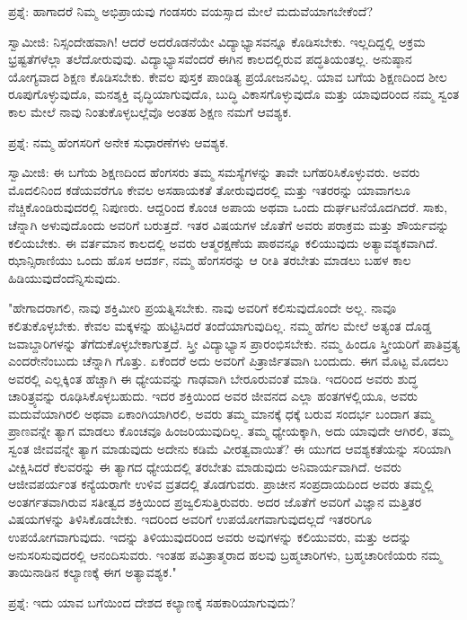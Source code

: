 ಪ್ರಶ್ನೆ: ಹಾಗಾದರೆ ನಿಮ್ಮ ಅಭಿಪ್ರಾಯವು ಗಂಡಸರು ವಯಸ್ಸಾದ ಮೇಲೆ ಮದುವೆಯಾಗಬೇಕೆಂದೆ?

ಸ್ವಾಮೀಜಿ: ನಿಸ್ಸಂದೇಹವಾಗಿ! ಆದರೆ ಅದರೊಡನೆಯೇ ವಿದ್ಯಾಭ್ಯಾಸವನ್ನೂ ಕೊಡಿಸಬೇಕು. ಇಲ್ಲದಿದ್ದಲ್ಲಿ ಅಕ್ರಮ ಭ್ರಷ್ಟತೆಗಳೆಲ್ಲಾ ತಲೆದೋರುವುವು. ವಿದ್ಯಾಭ್ಯಾಸವೆಂದರೆ ಈಗಿನ ಕಾಲದಲ್ಲಿರುವ ಪದ್ಧತಿಯಂತಲ್ಲ. ಅನುಷ್ಠಾನ ಯೋಗ್ಯವಾದ ಶಿಕ್ಷಣ ಕೊಡಿಸಬೇಕು. ಕೇವಲ ಪುಸ್ತಕ ಪಾಂಡಿತ್ಯ ಪ್ರಯೋಜನವಿಲ್ಲ. ಯಾವ ಬಗೆಯ ಶಿಕ್ಷಣದಿಂದ ಶೀಲ ರೂಪುಗೊಳ್ಳುವುದೊ, ಮನಶ್ಶಕ್ತಿ ವೃದ್ಧಿಯಾಗುವುದೊ, ಬುದ್ಧಿ ವಿಕಾಸಗೊಳ್ಳುವುದೊ ಮತ್ತು ಯಾವುದರಿಂದ ನಮ್ಮ ಸ್ವಂತ ಕಾಲ ಮೇಲೆ ನಾವು ನಿಂತುಕೊಳ್ಳಬಲ್ಲೆವೊ ಅಂತಹ ಶಿಕ್ಷಣ ನಮಗೆ ಆವಶ್ಯಕ.

ಪ್ರಶ್ನೆ: ನಮ್ಮ ಹೆಂಗಸರಿಗೆ ಅನೇಕ ಸುಧಾರಣೆಗಳು ಆವಶ್ಯಕ.

ಸ್ವಾಮೀಜಿ: ಈ ಬಗೆಯ ಶಿಕ್ಷಣದಿಂದ ಹೆಂಗಸರು ತಮ್ಮ ಸಮಸ್ಯೆಗಳನ್ನು ತಾವೇ ಬಗೆಹರಿಸಿಕೊಳ್ಳುವರು. ಅವರು ಮೊದಲಿನಿಂದ ಕಡೆಯವರೆಗೂ ಕೇವಲ ಅಸಹಾಯಕತೆ ತೋರುವುದರಲ್ಲಿ ಮತ್ತು ಇತರರನ್ನು ಯಾವಾಗಲೂ ನೆಚ್ಚಿಕೊಂಡಿರುವುದರಲ್ಲಿ ನಿಪುಣರು. ಆದ್ದರಿಂದ ಕೊಂಚ ಅಪಾಯ ಅಥವಾ ಒಂದು ದುರ್ಘಟನೆಯೊದಗಿದರೆ. ಸಾಕು, ಚೆನ್ನಾಗಿ ಅಳುವುದೊಂದು ಅವರಿಗೆ ಬರುತ್ತದೆ. ಇತರ ವಿಷಯಗಳ ಜೊತೆಗೆ ಅವರು ಪರಾಕ್ರಮ ಮತ್ತು ಶೌರ್ಯವನ್ನು ಕಲಿಯಬೇಕು. ಈ ವರ್ತಮಾನ ಕಾಲದಲ್ಲಿ ಅವರು ಆತ್ಮರಕ್ಷಣೆಯ ಪಾಠವನ್ನೂ ಕಲಿಯುವುದು ಅತ್ಯಾವಶ್ಯಕವಾಗಿದೆ. ಝಾನ್ಸಿರಾಣಿಯು ಒಂದು ಹೊಸ ಆದರ್ಶ, ನಮ್ಮ ಹೆಂಗಸರನ್ನು ಆ ರೀತಿ ತರಬೇತು ಮಾಡಲು ಬಹಳ ಕಾಲ ಹಿಡಿಯುವುದೆಂದೆನ್ನಿಸುವುದು.

"ಹೇಗಾದರಾಗಲಿ, ನಾವು ಶಕ್ತಿಮೀರಿ ಪ್ರಯತ್ನಿಸಬೇಕು. ನಾವು ಅವರಿಗೆ ಕಲಿಸುವುದೊಂದೇ ಅಲ್ಲ. ನಾವೂ ಕಲಿತುಕೊಳ್ಳಬೇಕು. ಕೇವಲ ಮಕ್ಕಳನ್ನು ಹುಟ್ಟಿಸಿದರೆ ತಂದೆಯಾಗುವುದಿಲ್ಲ. ನಮ್ಮ ಹೆಗಲ ಮೇಲೆ ಅತ್ಯಂತ ದೊಡ್ಡ ಜವಾಬ್ದಾರಿಗಳನ್ನು ತೆಗೆದುಕೊಳ್ಳಬೇಕಾಗುತ್ತದೆ. ಸ್ತ್ರೀ ವಿದ್ಯಾಭ್ಯಾಸ ಪ್ರಾರಂಭಿಸಬೇಕು. ನಮ್ಮ ಹಿಂದೂ ಸ್ತ್ರೀಯರಿಗೆ ಪಾತಿವ್ರತ್ಯ ಎಂದರೇನೆಂಬುದು ಚೆನ್ನಾಗಿ ಗೊತ್ತು. ಏಕೆಂದರೆ ಅದು ಅವರಿಗೆ ಪಿತ್ರಾರ್ಜಿತವಾಗಿ ಬಂದುದು. ಈಗ ಮೊಟ್ಟ ಮೊದಲು ಅವರಲ್ಲಿ ಎಲ್ಲಕ್ಕಿಂತ ಹೆಚ್ಚಾಗಿ ಈ ಧ್ಯೇಯವನ್ನು ಗಾಢವಾಗಿ ಬೇರೂರುವಂತೆ ಮಾಡಿ. ಇದರಿಂದ ಅವರು ಶುದ್ಧ ಚಾರಿತ್ರ್ಯವನ್ನು ರೂಢಿಸಿಕೊಳ್ಳಬಹುದು. ಇದರ ಶಕ್ತಿಯಿಂದ ಅವರ ಜೀವನದ ಎಲ್ಲಾ ಹಂತಗಳಲ್ಲಿಯೂ, ಅವರು ಮದುವೆಯಾಗಿರಲಿ ಅಥವಾ ಏಕಾಂಗಿಯಾಗಿರಲಿ, ಅವರು ತಮ್ಮ ಮಾನಕ್ಕೆ ಧಕ್ಕೆ ಬರುವ ಸಂದರ್ಭ ಬಂದಾಗ ತಮ್ಮ ಪ್ರಾಣವನ್ನೇ ತ್ಯಾಗ ಮಾಡಲು ಕೊಂಚವೂ ಹಿಂಜರಿಯುವುದಿಲ್ಲ. ತಮ್ಮ ಧ್ಯೇಯಕ್ಕಾಗಿ, ಅದು ಯಾವುದೇ ಆಗಿರಲಿ, ತಮ್ಮ ಸ್ವಂತ ಜೀವವನ್ನೇ ತ್ಯಾಗ ಮಾಡುವುದು ಅದೇನು ಕಡಿಮೆ ವೀರತ್ವವಾಯಿತೆ? ಈ ಯುಗದ ಆವಶ್ಯಕತೆಯನ್ನು ಸರಿಯಾಗಿ ವೀಕ್ಷಿಸಿದರೆ ಕೆಲವರನ್ನು ಈ ತ್ಯಾಗದ ಧ್ಯೇಯದಲ್ಲಿ ತರಬೇತು ಮಾಡುವುದು ಅನಿವಾರ್ಯವಾಗಿದೆ. ಅವರು ಆಜೀವಪರ್ಯಂತ ಕನ್ಯೆಯರಾಗೇ ಉಳಿವ ವ್ರತದಲ್ಲಿ ತೊಡಗುವರು. ಪ್ರಾಚೀನ ಸಂಪ್ರದಾಯದಿಂದ ಅವರು ತಮ್ಮಲ್ಲಿ ಅಂತರ್ಗತವಾಗಿರುವ ಸತೀತ್ವದ ಶಕ್ತಿಯಿಂದ ಪ್ರಜ್ವಲಿಸುತ್ತಿರುವರು. ಅದರ ಜೊತೆಗೆ ಅವರಿಗೆ ವಿಜ್ಞಾನ ಮತ್ತಿತರ ವಿಷಯಗಳನ್ನು ತಿಳಿಸಿಕೊಡಬೇಕು. ಇದರಿಂದ ಅವರಿಗೆ ಉಪಯೋಗವಾಗುವುದಲ್ಲದೆ ಇತರರಿಗೂ ಉಪಯೋಗವಾಗುವುದು. ಇದನ್ನು ತಿಳಿಯುವುದರಿಂದ ಅವರು ಅವುಗಳನ್ನು ಕಲಿಯುವರು, ಮತ್ತು ಅದನ್ನು ಅನುಸರಿಸುವುದರಲ್ಲಿ ಆನಂದಿಸುವರು. ಇಂತಹ ಪವಿತ್ರಾತ್ಮರಾದ ಹಲವು ಬ್ರಹ್ಮಚಾರಿಗಳು, ಬ್ರಹ್ಮಚಾರಿಣಿಯರು ನಮ್ಮ ತಾಯಿನಾಡಿನ ಕಲ್ಯಾಣಕ್ಕೆ ಈಗ ಅತ್ಯಾವಶ್ಯಕ."

ಪ್ರಶ್ನೆ: ಇದು ಯಾವ ಬಗೆಯಿಂದ ದೇಶದ ಕಲ್ಯಾಣಕ್ಕೆ ಸಹಕಾರಿಯಾಗುವುದು?

